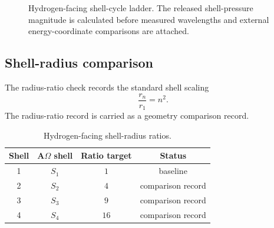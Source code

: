 \begin{figure}[h]
\centering
\scriptsize
{}
\caption{Hydrogen-facing shell-cycle ladder. The released shell-pressure magnitude is calculated before measured wavelengths and external energy-coordinate comparisons are attached.}
\label{fig:manual-hydrogen-shell-setup}
\end{figure}

\subsection{Shell-radius comparison}\label{manual:hydrogen:radii}
The radius-ratio check records the standard shell scaling
\[
\frac{r_n}{r_1}=n^2.
\]
The radius-ratio record is carried as a geometry comparison record.

\begin{table}[h]
\centering
\scriptsize
\caption{Hydrogen-facing shell-radius ratios.}
\begin{tabular}{c c c c}
\toprule
Shell & A\(\Omega\) shell & Ratio target & Status\\
\midrule
1 & $S_1$ & $1$ & baseline\\
2 & $S_2$ & $4$ & comparison record\\
3 & $S_3$ & $9$ & comparison record\\
4 & $S_4$ & $16$ & comparison record\\
\bottomrule
\end{tabular}
\label{tab:manual-hydrogen-shell-radii}
\end{table}

